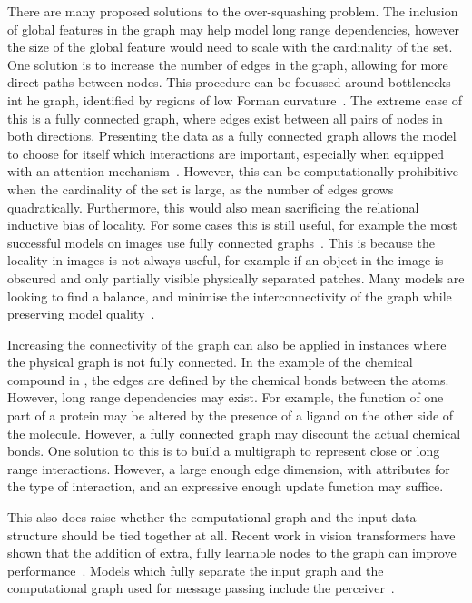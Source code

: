 There are many proposed solutions to the over-squashing problem.
The inclusion of global features in the graph may help model long range dependencies, however the size of the global feature would need to scale with the cardinality of the set.
One solution is to increase the number of edges in the graph, allowing for more direct paths between nodes.
This procedure can be focussed around bottlenecks int he graph, identified by regions of low Forman curvature~.
The extreme case of this is a fully connected graph, where edges exist between all pairs of nodes in both directions.
Presenting the data as a fully connected graph allows the model to choose for itself which interactions are important, especially when equipped with an attention mechanism~.
However, this can be computationally prohibitive when the cardinality of the set is large, as the number of edges grows quadratically.
Furthermore, this would also mean sacrificing the relational inductive bias of locality.
For some cases this is still useful, for example the most successful models on images use fully connected graphs~.
This is because the locality in images is not always useful, for example if an object in the image is obscured and only partially visible physically separated patches.
Many models are looking to find a balance, and minimise the interconnectivity of the graph while preserving model quality~.

Increasing the connectivity of the graph can also be applied in instances where the physical graph is not fully connected.
In the example of the chemical compound in , the edges are defined by the chemical bonds between the atoms.
However, long range dependencies may exist.
For example, the function of one part of a protein may be altered by the presence of a ligand on the other side of the molecule.
However, a fully connected graph may discount the actual chemical bonds.
One solution to this is to build a multigraph to represent close or long range interactions.
However, a large enough edge dimension, with attributes for the type of interaction, and an expressive enough update function may suffice.

This also does raise whether the computational graph and the input data structure should be tied together at all.
Recent work in vision transformers have shown that the addition of extra, fully learnable nodes to the graph can improve performance~.
Models which fully separate the input graph and the computational graph used for message passing include the perceiver~.

